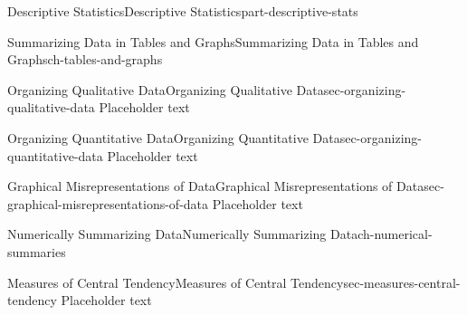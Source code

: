 \documentclass[oneside,10pt,]{book}
\numberwithin{equation}{section}
\begin{document}
\begin{partptx}{Descriptive Statistics}{}{Descriptive Statistics}{}{}{part-descriptive-stats}
%
\typeout{************************************************}
\typeout{************************************************}
%
\begin{chapterptx}{Summarizing Data in Tables and Graphs}{}{Summarizing Data in Tables and Graphs}{}{}{ch-tables-and-graphs}
%
%
\typeout{************************************************}
\typeout{************************************************}
%
\begin{sectionptx}{Organizing Qualitative Data}{}{Organizing Qualitative Data}{}{}{sec-organizing-qualitative-data}
\hypertarget{p-31}{}%
Placeholder text%
\end{sectionptx}
%
%
\typeout{************************************************}
\typeout{************************************************}
%
\begin{sectionptx}{Organizing Quantitative Data}{}{Organizing Quantitative Data}{}{}{sec-organizing-quantitative-data}
\hypertarget{p-32}{}%
Placeholder text%
\end{sectionptx}
%
%
\typeout{************************************************}
\typeout{************************************************}
%
\begin{sectionptx}{Graphical Misrepresentations of Data}{}{Graphical Misrepresentations of Data}{}{}{sec-graphical-misrepresentations-of-data}
\hypertarget{p-33}{}%
Placeholder text%
\end{sectionptx}
\end{chapterptx}
%
\typeout{************************************************}
\typeout{************************************************}
%
\begin{chapterptx}{Numerically Summarizing Data}{}{Numerically Summarizing Data}{}{}{ch-numerical-summaries}
%
%
\typeout{************************************************}
\typeout{************************************************}
%
\begin{sectionptx}{Measures of Central Tendency}{}{Measures of Central Tendency}{}{}{sec-measures-central-tendency}
\hypertarget{p-34}{}%
Placeholder text%
\end{sectionptx}

\end{chapterptx}
\end{partptx}
\end{document}
